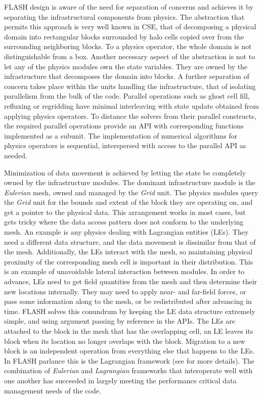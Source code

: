 FLASH design is aware of the need for separation of concerns and
achieves it by separating the infrastructural components
from physics. The abstraction that permits this approach is very
well known in CSE, that of decomposing a physical domain into
rectangular blocks surrounded by halo cells copied over from the
surrounding neighboring blocks. To a physics operator, the whole domain is
not distinguishable from a box. Another necessary aspect of the abstraction 
is not to let any of the physics modules own the state
variables. They are owned by the infrastructure that 
decomposes the domain into blocks. A further separation of concern
takes place within the units handling the infrastructure, that of
isolating parallelism from the bulk of the code. Parallel
operations such as ghost cell fill, refluxing or regridding have
minimal interleaving with state update obtained from applying
physics operators. To distance the solvers from their parallel
constructs, the required parallel operations provide an API with
corresponding functions implemented as a subunit. The implementation
of numerical algorithms for physics operators is sequential,
interspersed with access to the parallel API as needed. 

Minimization of data movement is achieved by letting the state be
completely owned by the infrastructure modules. The dominant
infrastructure module is the {\em Eulerian} mesh, owned and managed by
the {\em Grid} unit. The physics modules query the {\em Grid} unit
for the bounds and extent of the block they are operating on, and
get a pointer to the physical data. This arrangement works in most
cases, but gets tricky where  the data access pattern does not conform
to the underlying mesh. An example is any physics dealing with
Lagrangian entities (LEs). They need a different data structure, and
the data movement is dissimilar from that of the mesh. Additionally,
the LEs interact with the mesh, so maintaining physical proximity of
the corresponding mesh cell is important in their distribution. This
is an example of unavoidable lateral interaction between modules. In order
to advance, LEs need to get field quantities from the mesh and
then determine their new locations internally. They may
need to apply near- and far-field forces, or pass some information
along to the mesh, or be redistributed after advancing in time. FLASH solves 
this conundrum by keeping the LE data structure extremely simple,
and using argument passing by reference in the APIs. The LEs are
attached to the block in the mesh that has the overlapping cell, an LE
leaves its block when its location no longer overlaps with the
block. Migration to a new block is an independent operation from
everything else that happens to the LEs. In FLASH parlance this is
the Lagrangian framework (see \cite{Dubey2012} for more details). The
combination of {\em Eulerian} and {\em Lagrangian} frameworks that
interoperate well with one another has succeeded in largely meeting the
performance critical data management needs of the code. 

